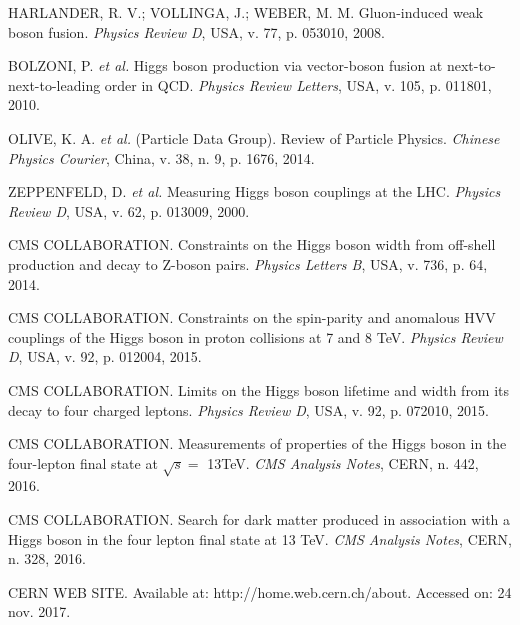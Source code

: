 \begin{thebibliography}{}
HARLANDER, R. V.; VOLLINGA, J.; WEBER, M. M. Gluon-induced weak boson fusion. \textit{Physics Review D}, USA, v. 77, p. 053010, 2008.

BOLZONI, P. \textit{et al.} Higgs boson production via vector-boson fusion at next-to-next-to-leading order in QCD. \textit{Physics Review Letters}, USA, v. 105, p. 011801, 2010.

OLIVE, K. A. \textit{et al.} (Particle Data Group). Review of Particle Physics. \textit{Chinese Physics Courier}, China, v. 38, n. 9, p. 1676, 2014.

ZEPPENFELD, D. \textit{et al.} Measuring Higgs boson couplings at the LHC. \textit{Physics Review D}, USA, v. 62, p. 013009, 2000.

CMS COLLABORATION. Constraints on the Higgs boson width from off-shell production and decay to Z-boson pairs. \textit{Physics Letters B}, USA, v. 736, p. 64, 2014.

CMS COLLABORATION. Constraints on the spin-parity and anomalous HVV couplings of the Higgs boson in proton collisions at 7 and 8 TeV. \textit{Physics Review D}, USA, v. 92, p. 012004, 2015.

CMS COLLABORATION. Limits on the Higgs boson lifetime and width from its decay to four charged leptons. \textit{Physics Review D}, USA, v. 92, p. 072010, 2015.

CMS COLLABORATION. Measurements of properties of the Higgs boson in the four-lepton final state at $\sqrt{s}=$ 13TeV. \textit{CMS Analysis Notes}, CERN, n. 442, 2016.

CMS COLLABORATION. Search for dark matter produced in association with a Higgs boson in the four lepton final state at 13 TeV. \textit{CMS Analysis Notes}, CERN, n. 328, 2016.



CERN WEB SITE. Available at: http://home.web.cern.ch/about. Accessed on: 24 nov. 2017.


\end{thebibliography}
